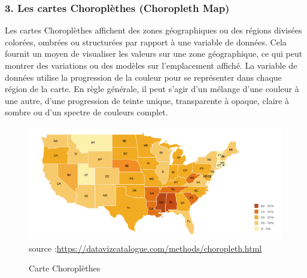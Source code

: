 \documentclass[french, a4paper, 12pt]{report}
\begin{document}
\subsubsection{3. Les cartes Choroplèthes (Choropleth Map)}
Les cartes Choroplèthes affichent des zones géographiques ou des régions divisées colorées, ombrées ou structurées par rapport à une variable de données. Cela fournit un moyen de visualiser les valeurs sur une zone géographique, ce qui peut montrer des variations ou des modèles sur l'emplacement affiché.
La variable de données utilise la progression de la couleur pour se représenter dans chaque région de la carte. En règle générale, il peut s'agir d'un mélange d'une couleur à une autre, d'une progression de teinte unique, transparente à opaque, claire à sombre ou d'un spectre de couleurs complet.
\begin{figure}[!ht]
    \centering
    \includegraphics[height=5cm]{images/choropleth.png}
    \scriptsize{source :\url{https://datavizcatalogue.com/methods/choropleth.html}}
    \caption{Carte Choroplèthes }
    \label{fig:2.6}
\end{figure}
\end{document}
